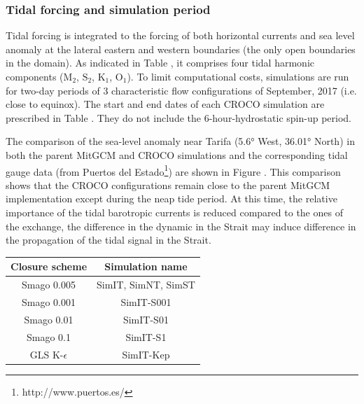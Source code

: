 \subsubsection{Tidal forcing and simulation period}
Tidal forcing is integrated to the forcing \color{red}of both horizontal currents and sea level anomaly\color{black} at the lateral eastern and western boundaries (the only open boundaries in the domain). As indicated in Table , it comprises four tidal harmonic components ($\text{M}_{\text{2}}$, $\text{S}_{\text{2}}$, $\text{K}_{\text{1}}$, $\text{O}_{\text{1}}$). To limit computational costs, simulations are run for two-day periods of 3 characteristic flow configurations of September, 2017 (i.e. close to equinox). The start and end dates of each CROCO simulation are prescribed in Table . They do not include the 6-hour-hydrostatic spin-up period.

The comparison of the sea-level anomaly near Tarifa (5.6° West, 36.01° North) in both the parent MitGCM and CROCO simulations and the corresponding tidal gauge data (from Puertos del Estado\footnote{http://www.puertos.es/}) are shown in Figure . This comparison shows that the CROCO configurations remain close to the parent MitGCM implementation except during the neap tide period. At this time, the relative importance of the tidal barotropic currents is reduced compared to the ones of the exchange, the difference in the dynamic in the Strait may induce difference in the propagation of the tidal signal in the Strait.

\begin{table}[!h]
        \centering
        \begin{tabular}{|c|c|}
                \hline
                Closure scheme & Simulation name\\
                \hline
                Smago 0.005 & SimIT, SimNT, SimST\\
                Smago 0.001 & SimIT-S001\\
                Smago 0.01 & SimIT-S01\\
                Smago 0.1 & SimIT-S1\\
                GLS K-$\epsilon$ & SimIT-Kep\\
                \hline
        \end{tabular}
        \label{tab_sim3Dnames}
\end{table}


